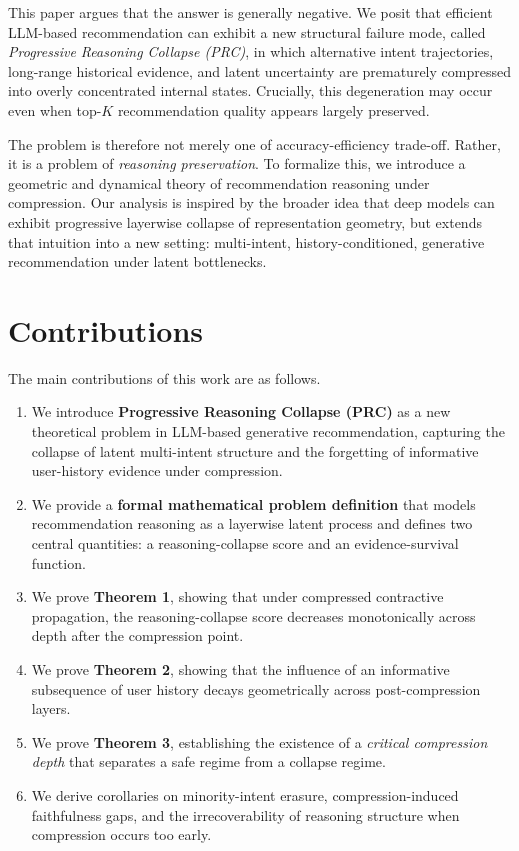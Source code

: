 \documentclass[11pt]{article}
\begin{document}
This paper argues that the answer is generally negative. We posit that efficient LLM-based recommendation can exhibit a new structural failure mode, called \emph{Progressive Reasoning Collapse (PRC)}, in which alternative intent trajectories, long-range historical evidence, and latent uncertainty are prematurely compressed into overly concentrated internal states. Crucially, this degeneration may occur even when top-$K$ recommendation quality appears largely preserved.

The problem is therefore not merely one of accuracy-efficiency trade-off. Rather, it is a problem of \emph{reasoning preservation}. To formalize this, we introduce a geometric and dynamical theory of recommendation reasoning under compression. Our analysis is inspired by the broader idea that deep models can exhibit progressive layerwise collapse of representation geometry, but extends that intuition into a new setting: multi-intent, history-conditioned, generative recommendation under latent bottlenecks.

\section{Contributions}

The main contributions of this work are as follows.

\begin{enumerate}[label=\textbf{C\arabic*.}]
    \item We introduce \textbf{Progressive Reasoning Collapse (PRC)} as a new theoretical problem in LLM-based generative recommendation, capturing the collapse of latent multi-intent structure and the forgetting of informative user-history evidence under compression.
    \item We provide a \textbf{formal mathematical problem definition} that models recommendation reasoning as a layerwise latent process and defines two central quantities: a reasoning-collapse score and an evidence-survival function.
    \item We prove \textbf{Theorem 1}, showing that under compressed contractive propagation, the reasoning-collapse score decreases monotonically across depth after the compression point.
    \item We prove \textbf{Theorem 2}, showing that the influence of an informative subsequence of user history decays geometrically across post-compression layers.
    \item We prove \textbf{Theorem 3}, establishing the existence of a \emph{critical compression depth} that separates a safe regime from a collapse regime.
    \item We derive corollaries on minority-intent erasure, compression-induced faithfulness gaps, and the irrecoverability of reasoning structure when compression occurs too early.
\end{enumerate}
\end{document}
